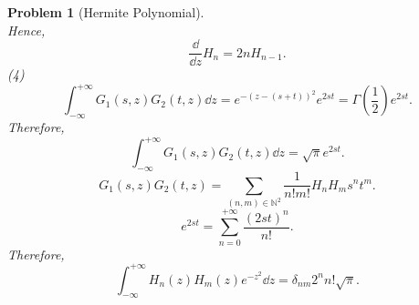 \documentclass{article}
\theoremstyle{1}
\newtheorem{problem}{Problem}
\begin{document}
\begin{problem}[Hermite Polynomial]
\begin{equation}
    \end{equation}
    Hence,
    \begin{equation}
        \boxed{\frac{\dd}{\dd{z}}H_n=2nH_{n-1}.}
    \end{equation}
    (4) \begin{equation}
        \int_{-\infty}^{+\infty}G_1(s,z)G_2(t,z)\dd{z}=e^{-(z-(s+t))^2}e^{2st}=\Gamma(\frac{1}{2})e^{2st}.
    \end{equation}
    Therefore,
    \begin{equation}
        \boxed{ \int_{-\infty}^{+\infty}G_1(s,z)G_2(t,z)\dd{z}=\sqrt{\pi}e^{2st}.}
    \end{equation}
    \begin{equation}
        G_1(s,z)G_2(t,z)=\sum_{(n,m)\in \mathbb{N}^2}\frac{1}{n!m!}H_nH_ms^nt^m.
    \end{equation}
    \begin{equation}
        e^{2st}=\sum_{n=0}^{+\infty}\frac{(2st)^n}{n!}.
    \end{equation}
    Therefore,
    \begin{equation}
        \boxed{\int_{-\infty}^{+\infty}H_n(z)H_m(z)e^{-z^2}\dd{z}=\delta_{nm}2^nn!\sqrt{\pi}.}
    \end{equation}
\end{problem}
\end{document}
